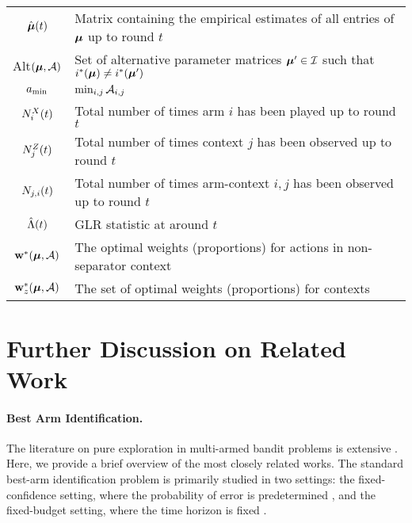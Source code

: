 \begin{table}[H]
\begin{tabular}{c|l}
        $\hat{\boldsymbol{\mu}}(t)$ &       Matrix containing the empirical estimates of all entries of $\boldsymbol{\mu}$ up to round $t$ \\
        Alt$(\boldsymbol{\mu}, \mathcal{A})$ & Set of alternative parameter matrices $\boldsymbol{\mu}' \in \mathcal{I}$ such that $i^*(\boldsymbol{\mu}) \neq i^*(\boldsymbol{\mu}')$ \\
        $a_{\min}$ & $\min_{i,j} \mathcal{A}_{i,j}$   \\    
        $N^{X}_{i}(t)$ &    Total number of times arm $i$ has been played up to round $t$ \\
        $N^{Z}_{j}(t)$ &    Total number of times context $j$ has been observed up to round $t$ \\
        $N_{j, i}(t)$ &   Total number of times arm-context $i, j$ has been observed up to round $t$ \\
        $\hat{\Lambda}(t)$ &      GLR statistic at around $t$ \\
        $\mathbf{w}^*(\boldsymbol{\mu}, \mathcal{A})$ &  The optimal weights (proportions) for actions in non-separator context \\
        $\mathbf{w}_z^*(\boldsymbol{\mu}, \mathcal{A})$          &  The set of optimal weights (proportions) for contexts \\
        \bottomrule
    \end{tabular}
\end{table}



\section{Further Discussion on Related Work} \label{apd: related-work}


\paragraph{Best Arm Identification.} 
The literature on pure exploration in multi-armed bandit problems is extensive \cite{bandit-book1-lattimore2020bandit, pure2-thesis-stephens2023pure}. Here, we provide a brief overview of the most closely related works. The standard best-arm identification problem is primarily studied in two settings: the fixed-confidence setting, where the probability of error is predetermined \cite{track-stop-garivier2016optimal, SR-audibert2010best, kaufmann2020contributions, confidence-jamieson2014best, lb-tsitsiklis-mannor2004sample}, and the fixed-budget setting, where the time horizon is fixed \cite{budget-confidence-gabillon2012best, SH-karnin2013almost, lb-budget-carpentier2016tight}. 


